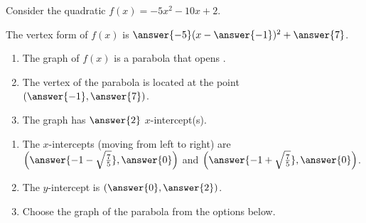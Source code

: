 \documentclass{ximera}
\author{Kenneth Berglund}
\begin{document}
Consider the quadratic $f(x) = -5x^2 - 10x + 2$.
\begin{exercise}
The vertex form of $f(x)$ is $\answer{-5}(x - \answer{-1})^2 + \answer{7}$.
\begin{exercise}
\begin{enumerate}
\item The graph of $f(x)$ is a parabola that opens .

\item The vertex of the parabola is located at the point $\left(\answer{-1}, \answer{7}\right)$.

\item The graph has $\answer{2}$ $x$-intercept(s).
\end{enumerate}
\begin{exercise}
\begin{enumerate}
\item The $x$-intercepts (moving from left to right) are $\left(\answer{-1 - \sqrt{\frac{7}{5}}}, \answer{0}\right)$ and $\left(\answer{-1 + \sqrt{\frac{7}{5}}}, \answer{0}\right)$.

\item The $y$-intercept is $(\answer{0}, \answer{2})$.

\item Choose the graph of the parabola from the options below.

\begin{image}
\end{image} 

\begin{image}
\end{image} 


\end{enumerate}
\end{exercise}
\end{exercise}
\end{exercise}
\end{document}
